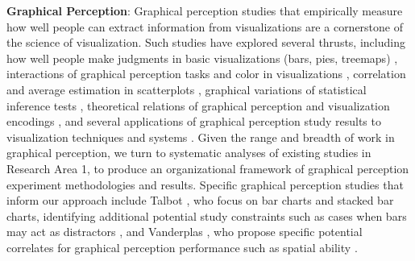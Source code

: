 \documentclass[11pt]{article}
\begin{document}
\noindent\textbf{Graphical Perception}:
Graphical perception studies that empirically measure how well people can extract information from visualizations are a cornerstone of the science of visualization.
Such studies have explored several thrusts, including how well people make judgments in basic visualizations (\eg bars, pies, treemaps)  \cite{hullman2011impact, talbot2014four, harrison2013influencing, heer2010crowdsourcing, kong2010perceptual, simkin1987information, cleveland1984graphical, zacks1998reading}, interactions of graphical perception tasks and color in visualizations \cite{stone2008alpha, padilla2017effects, bujack2017good, szafir2017modeling}, correlation and average estimation in scatterplots \cite{rensink2016nature, rensink2016entropy, elliott2015interference, sher2017empirical, correll2017regression, gleicher2013perception, rensink2010perception, bobko1979perception, cleveland1982variables, pollack1960identification, meyer1997correlation}, graphical variations of statistical inference tests \cite{hofmann2012graphical, wickham2010graphical, majumder2013validation, zhao2013mind, vanderplas2016spatial, beecham2017map}, theoretical relations of graphical perception and visualization encodings \cite{chen2016may, kindlmann2014algebraic, michal2017visual, michal2016visual, szafir2016four}, and several applications of graphical perception study results to visualization techniques and systems \cite{mackinlay1986automating, mackinlay2007show, wilkinson2005graph, zhang2015visual, faust2017dimreader, reinecke2016enabling, sedlmair2015data, sedlmair2013empirical, matute2017skeleton, alabi2016pfunk}.
Given the range and breadth of work in graphical perception, we turn to systematic analyses of existing studies in Research Area 1, to produce an organizational framework of graphical perception experiment methodologies and results.
Specific graphical perception studies that inform our approach include Talbot \etal, who focus on bar charts and stacked bar charts, identifying additional potential study constraints such as cases when bars may act as distractors \cite{talbot2014four}, and Vanderplas \etal, who propose specific potential correlates for graphical perception performance such as spatial ability \cite{vanderplas2016spatial}.
\end{document}
